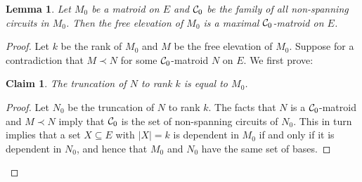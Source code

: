 \documentclass{daj}
\newtheorem{lemma}[thm]{Lemma}\theoremstyle{plain}
\newtheorem{claim}[thm]{Claim}\theoremstyle{plain}
\begin{document}
\begin{lemma}\label{lem:unique}
Let $M_0$ be a matroid on $E$ and ${\cal C}_0$ be the family of all non-spanning circuits in $M_0$.
Then the free elevation of $M_0$ is a  maximal ${\cal C}_0$-matroid on $E$.
\end{lemma}
\begin{proof}
Let $k$ be the rank of $M_0$ and $M$ be the free elevation of $M_0$.
Suppose for a contradiction that $M\prec N$ for some
${\cal C}_0$-matroid $N$ on $E$.
We first prove:
\begin{claim}\label{claim:unique}
The truncation of $N$ to rank $k$ is equal to $M_0$.
\end{claim}
\begin{proof}
Let $N_0$ be the truncation of $N$ to rank $k$. The facts that $N$ is a ${\cal C}_0$-matroid and $M\prec N$  imply that ${\cal C}_0$ is the set of non-spanning circuits of $N_0$. This in turn implies that a set $X\subseteq E$ with $|X|=k$ is dependent in $M_0$ if and only if it is dependent in $N_0$, and hence that $M_0$ and $N_0$ have the same set of bases.
%
%
\end{proof}





\end{proof}
\end{document}
